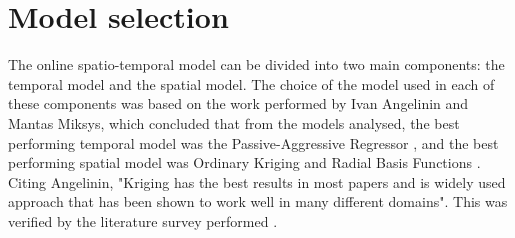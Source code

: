 \begin{table}[h]
\centering
{}
\caption{Statistical properties of the calibrated static data of dataset B}
\label{tab:statisticsB}
\end{table}


\section{Model selection}
The online spatio-temporal model can be divided into two main components: the temporal model and the spatial model. The choice of the model used in each of these components was based on the work performed by Ivan Angelinin and Mantas Miksys, which concluded that from the models analysed, the best performing temporal model was the Passive-Aggressive Regressor \cite{ivan}, and the best performing spatial model was Ordinary Kriging and Radial Basis Functions \cite{mantas}. Citing Angelinin, "Kriging has the best results in most papers and is widely used approach that has been shown to work well in many different domains"\cite{ivan}. This was verified by the literature survey performed \cite{st_state} \cite{env_book}.

